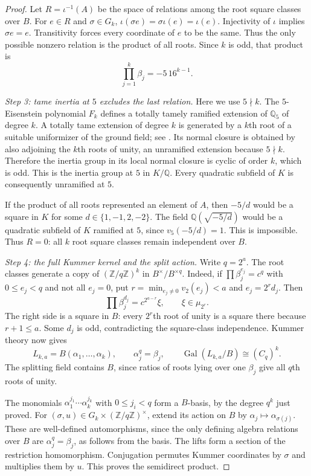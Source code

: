 \documentclass[11pt,a4paper]{article}
\theoremstyle{definition}
\theoremstyle{remark}
\numberwithin{equation}{section}
\begin{document}
\begin{proof}
Let $R=\iota^{-1}(A)$ be the space of relations among the root square
classes over $B$. For $e\in R$ and $\sigma\in G_k$,
$\iota(\sigma e)=\sigma\iota(e)=\iota(e)$. Injectivity of $\iota$
implies $\sigma e=e$. Transitivity forces every coordinate of $e$ to
be the same. Thus the only possible nonzero relation is the product
of all roots. Since $k$ is odd, that product is
\[
 \prod_{j=1}^k\beta_j=-5\,16^{k-1}.
\]

\emph{Step 3: tame inertia at $5$ excludes the last relation.}
Here we use $5\nmid k$. The $5$-Eisenstein polynomial $F_k$ defines
a totally tamely ramified extension of $\mathbb Q_5$ of degree $k$.
A totally tame extension of degree $k$ is generated by a $k$th root
of a suitable uniformizer of the ground field; see
\cite[Theorem~11.10]{R103}. Its normal closure is obtained
by also adjoining the $k$th roots of unity, an unramified extension
because $5\nmid k$. Therefore the inertia group in its local normal
closure is cyclic of order $k$, which is odd. This is the inertia group
at $5$ in $K/\mathbb Q$. Every quadratic subfield of $K$ is consequently
unramified at $5$.

If the product of all roots represented an element of $A$, then
$-5/d$ would be a square in $K$ for some $d\in\{1,-1,2,-2\}$.
The field $\mathbb Q(\sqrt{-5/d})$ would be a quadratic subfield of
$K$ ramified at $5$, since $v_5(-5/d)=1$. This is impossible.
Thus $R=0$: all $k$ root square classes remain independent over $B$.

\emph{Step 4: the full Kummer kernel and the split action.}
Write $q=2^a$. The root classes generate a copy of
$(\mathbb Z/q\mathbb Z)^k$ in $B^\times/B^{\times q}$.
Indeed, if $\prod\beta_j^{e_j}=c^q$ with $0\le e_j<q$ and not all
$e_j=0$, put $r=\min_{e_j\ne0}v_2(e_j)<a$ and $e_j=2^r d_j$.
Then
\[
 \prod\beta_j^{d_j}=c^{2^{a-r}}\xi,\qquad \xi\in\mu_{2^r}.
\]
The right side is a square in $B$: every $2^r$th root of unity is a
square there because $r+1\le a$. Some $d_j$ is odd, contradicting the
square-class independence. Kummer theory \cite{R101} now gives
\[
 L_{k,a}=B(\alpha_1,\ldots,\alpha_k),\qquad
 \alpha_j^q=\beta_j,\qquad
 \operatorname{Gal}(L_{k,a}/B)\cong(C_q)^k.
\]
The splitting field contains $B$, since ratios of roots lying over
one $\beta_j$ give all $q$th roots of unity.

The monomials $\alpha_1^{j_1}\cdots\alpha_k^{j_k}$ with $0\le j_i<q$
form a $B$-basis, by the degree $q^k$ just proved. For
$(\sigma,u)\in G_k\times(\mathbb Z/q\mathbb Z)^\times$, extend its
action on $B$ by $\alpha_j\mapsto\alpha_{\sigma(j)}$. These are
well-defined automorphisms, since the only defining algebra relations
over $B$ are $\alpha_j^q=\beta_j$, as follows from the basis.
The lifts form a section of the restriction homomorphism. Conjugation
permutes Kummer coordinates by $\sigma$ and multiplies them by $u$.
This proves the semidirect product.


\end{proof}
\end{document}
